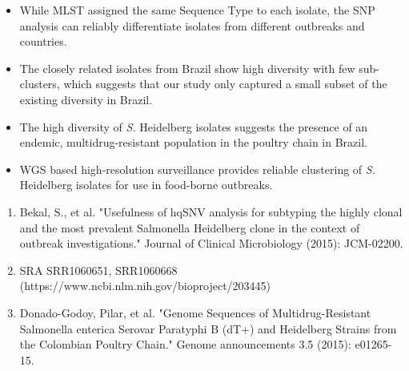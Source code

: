 \documentclass[portrait,a0paper,fontscale=0.31]{baposter}
\newcommand{\heidelberg}{\textit{S.} Heidelberg }
\newcommand{\mdr}{multidrug-resistant }
\newcommand{\padd}{\vspace*{0.2cm}}
\begin{document}
\begin{poster}
   {
    \padd
    \begin{multicols}{2}
    \begin{itemize}
      \item While MLST assigned the same Sequence Type to each isolate, the SNP analysis can reliably differentiate isolates from different outbreaks and countries.
      \item The closely related isolates from Brazil show high diversity with few sub-clusters, which suggests that our study only captured a small subset of the existing diversity in Brazil.
      \item The high diversity of \heidelberg isolates suggests the presence of an endemic, \mdr population in the poultry chain in Brazil.
      \item WGS based high-resolution surveillance provides reliable clustering of \heidelberg isolates for use in food-borne outbreaks.\newline
    \end{itemize}
    \end{multicols}
  }

   {
    \begin{enumerate}[itemsep=-0.3ex,leftmargin=0.29cm]
      \tiny
      \item Bekal, S., et al. "Usefulness of hqSNV analysis for subtyping the highly clonal and the most prevalent Salmonella Heidelberg clone in the context of outbreak investigations." Journal of Clinical Microbiology (2015): JCM-02200.
      \item SRA SRR1060651, SRR1060668 (https://www.ncbi.nlm.nih.gov/bioproject/203445)
      \item Donado-Godoy, Pilar, et al. "Genome Sequences of Multidrug-Resistant Salmonella enterica Serovar Paratyphi B (dT+) and Heidelberg Strains from the Colombian Poultry Chain." Genome announcements 3.5 (2015): e01265-15.
    \end{enumerate}
  }


\end{poster}
\end{document}
